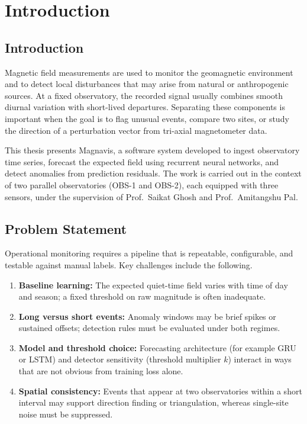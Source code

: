 \chapter{Introduction}\doublespacing
\label{Chapter1}

\section{Introduction}
Magnetic field measurements are used to monitor the geomagnetic environment and to detect local disturbances that may arise from natural or anthropogenic sources. At a fixed observatory, the recorded signal usually combines smooth diurnal variation with short-lived departures. Separating these components is important when the goal is to flag unusual events, compare two sites, or study the direction of a perturbation vector from tri-axial magnetometer data.

This thesis presents Magnavis, a software system developed to ingest observatory time series, forecast the expected field using recurrent neural networks, and detect anomalies from prediction residuals. The work is carried out in the context of two parallel observatories (OBS-1 and OBS-2), each equipped with three sensors, under the supervision of Prof.\ Saikat Ghosh and Prof.\ Amitangshu Pal.

\section{Problem Statement}
Operational monitoring requires a pipeline that is repeatable, configurable, and testable against manual labels. Key challenges include the following.
\begin{enumerate}[label=(\alph*)]
    \item \textbf{Baseline learning:} The expected quiet-time field varies with time of day and season; a fixed threshold on raw magnitude is often inadequate.
    \item \textbf{Long versus short events:} Anomaly windows may be brief spikes or sustained offsets; detection rules must be evaluated under both regimes.
    \item \textbf{Model and threshold choice:} Forecasting architecture (for example GRU or LSTM) and detector sensitivity (threshold multiplier $k$) interact in ways that are not obvious from training loss alone.
    \item \textbf{Spatial consistency:} Events that appear at two observatories within a short interval may support direction finding or triangulation, whereas single-site noise must be suppressed.
\end{enumerate}

